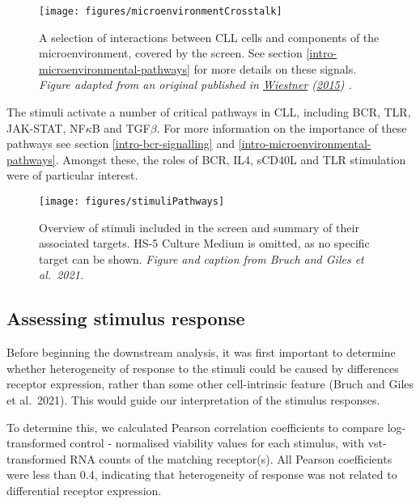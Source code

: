 \documentclass[11pt, a4paper, twosided]{book}
\begin{document}
\begin{figure}

{\centering \texttt{[image: figures/microenvironmentCrosstalk]} 

}

\caption{A selection of interactions between CLL cells and components of the microenvironment, covered by the screen. See section \ref{intro-microenvironmental-pathways} for more details on these signals. \emph{Figure adapted from an original published in \protect\hyperlink{ref-Wiestner2015}{Wiestner} (\protect\hyperlink{ref-Wiestner2015}{2015}) .}}\label{fig:microenvironmentCrosstalk}
\end{figure}
The stimuli activate a number of critical pathways in CLL, including BCR, TLR, JAK-STAT, NF\(\kappa\)B and TGF\(\beta\). For more information on the importance of these pathways see section \ref{intro-bcr-signalling} and \ref{intro-microenvironmental-pathways}. Amongst these, the roles of BCR, IL4, sCD40L and TLR stimulation were of particular interest.


\begin{figure}

{\centering \texttt{[image: figures/stimuliPathways]} 

}

\caption{Overview of stimuli included in the screen and summary of their associated targets. HS-5 Culture Medium is omitted, as no specific target can be shown. \emph{Figure and caption from Bruch and Giles et al.~2021.}}\label{fig:stimuliPathways}
\end{figure}
\hypertarget{rna-correlations}{%
\subsection{Assessing stimulus response}\label{rna-correlations}}

Before beginning the downstream analysis, it was first important to determine whether heterogeneity of response to the stimuli could be caused by differences receptor expression, rather than some other cell-intrinsic feature (Bruch and Giles et al.~2021). This would guide our interpretation of the stimulus responses.

To determine this, we calculated Pearson correlation coefficients to compare log-transformed control - normalised viability values for each stimulus, with vst-transformed RNA counts of the matching receptor(s). All Pearson coefficients were less than 0.4, indicating that heterogeneity of response was not related to differential receptor expression.
\end{document}
